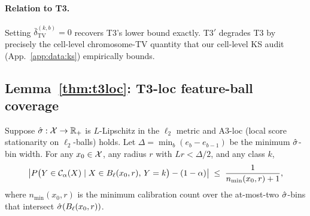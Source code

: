 \paragraph{Relation to T3.}
Setting $\bar\delta_{\mathrm{TV}}^{(k,b)} = 0$ recovers T3's lower bound exactly. T3$'$ degrades T3 by precisely the cell-level chromosome-TV quantity that our cell-level KS audit (App.~\ref{app:data:ks}) empirically bounds.


\subsection{Lemma~\ref{thm:t3loc}: T3-loc feature-ball coverage}
\label{app:proofs:t3loc}

\begin{lemma}
\label{thm:t3loc}
Suppose $\hat{\sigma} : \mathcal{X} \to \mathbb{R}_+$ is $L$-Lipschitz in the $\ell_2$ metric and A3-loc (local score stationarity on $\ell_2$-balls) holds. Let $\Delta = \min_b (e_b - e_{b-1})$ be the minimum $\hat{\sigma}$-bin width. For any $x_0 \in \mathcal{X}$, any radius $r$ with $Lr < \Delta / 2$, and any class $k$,
\[
\left| P\bigl(Y \in \mathcal{C}_\alpha(X) \mid X \in B_\ell(x_0, r),\, Y = k\bigr) - (1 - \alpha) \right| \;\leq\; \frac{1}{n_{\min}(x_0, r) + 1},
\]
where $n_{\min}(x_0, r)$ is the minimum calibration count over the at-most-two $\hat{\sigma}$-bins that intersect $\hat{\sigma}(B_\ell(x_0, r))$.
\end{lemma}

